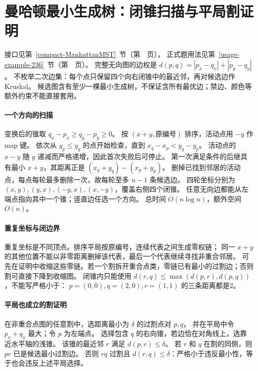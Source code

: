 \section{曼哈顿最小生成树：闭锥扫描与平局割证明}\label{knowledge-manhattan-mst}
接口见第~\ref{compact-ManhattanMST}~节（第~\pageref{compact-ManhattanMST}~页），
正式题用法见第~\ref{usage-example-236}~节（第~\pageref{usage-example-236}~页）。
完整无向图的边权是 $d(p,q)=|p_x-q_x|+|p_y-q_y|$。
不枚举二次边集：每个点只保留四个向右闭锥中的最近邻，再对候选边作 Kruskal。
候选图含有至少一棵最小生成树，不保证含所有最优边；禁边、颜色等额外约束不能直接套用。

\paragraph{一个方向的扫描}
变换后的锥取 $q_x-p_x\ge q_y-p_y\ge0$。
按 $(x+y,\text{原编号})$ 排序，活动点用 $-y$ 作 map 键。
依次从 $y_p\le y_q$ 的点开始检查，直到 $x_q-x_p<y_q-y_p$。
活动点的 $x-y$ 随 $y$ 递减而严格递增，因此首次失败后可停止。
第一次满足条件的后继具有最小 $x+y$，其距离正是 $(x_q+y_q)-(x_p+y_p)$。
删掉已找到邻居的活动点，每点每轮最多删除一次，故每轮至多 $n-1$ 条候选边。
四轮坐标分别为 $(x,y),(y,x),(-y,x),(x,-y)$，覆盖右侧四个闭锥。
任意无向边都能从左端点指向其中一个锥；竖直边任选一个方向。
总时间 $O(n\log n)$，额外空间 $O(n)$。

\paragraph{重复坐标与闭边界}
重复坐标是不同顶点。排序平局按原编号，连续代表之间生成零权链；
同一 $x+y$ 的其他位置不能以非零距离删掉该代表，最后一个代表继续寻找非重合邻居。
可先在证明中收缩这些零链。若一个割拆开重合点类，零链已有最小的过割边；否则割可直接下降到收缩图。
闭锥内只能使用 $d(r,q)\le\max(d(p,r),d(p,q))$，不能写严格小于：
$p=(0,0),q=(2,0),r=(1,1)$ 的三条距离都是2。

\paragraph{平局也成立的割证明}
在非重合点图的任意割中，选距离最小为 $\delta$ 的过割点对 $p,q$，
并在平局中令 $p_x+q_x$ 最大；令 $p$ 为左端点。
选择包含 $q$ 的右向锥，若边恰在对角线上，选靠近水平轴的浅锥。
该锥的最近邻 $r$ 满足 $d(p,r)\le\delta$。
若 $r$ 和 $q$ 在割的同侧，则 $pr$ 已是候选最小过割边。
否则 $rq$ 过割且 $d(r,q)\le\delta$：严格小于违反最小性，等于也会违反上述平局选择。


